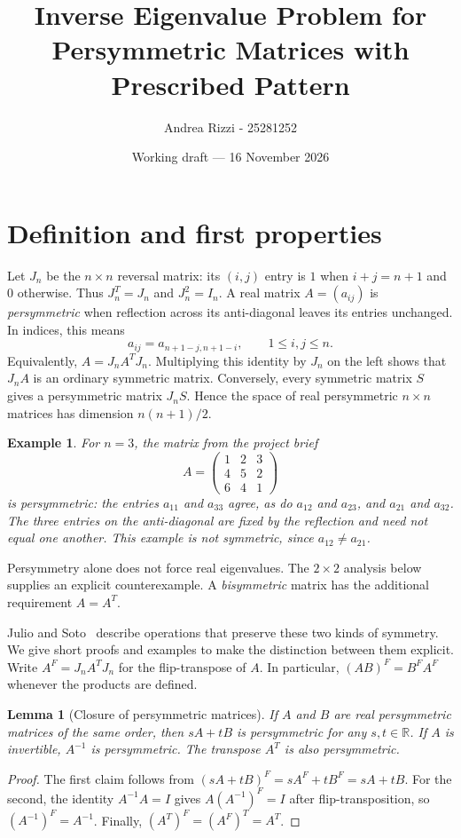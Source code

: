 \documentclass[11pt,a4paper]{article}
\title{Inverse Eigenvalue Problem for Persymmetric Matrices with Prescribed Pattern}
\author{Andrea Rizzi - 25281252}
\date{Working draft --- 16 November 2026}
\newtheorem{example}{Example}
\newtheorem{lemma}{Lemma}
\begin{document}
\maketitle

\section{Definition and first properties}

Let $J_n$ be the $n\times n$ reversal matrix: its $(i,j)$ entry is $1$ when
$i+j=n+1$ and $0$ otherwise. Thus $J_n^T=J_n$ and $J_n^2=I_n$. A real matrix
$A=(a_{ij})$ is \emph{persymmetric} when reflection across its anti-diagonal
leaves its entries unchanged. In indices, this means
\begin{equation}\label{eq:persymmetry}
 a_{ij}=a_{n+1-j,n+1-i},\qquad 1\leq i,j\leq n.
\end{equation}
Equivalently, $A=J_nA^TJ_n$. Multiplying this identity by $J_n$ on the left
shows that $J_nA$ is an ordinary symmetric matrix. Conversely, every symmetric
matrix $S$ gives a persymmetric matrix $J_nS$. Hence the space of real
persymmetric $n\times n$ matrices has dimension $n(n+1)/2$.

\begin{example}
For $n=3$, the matrix from the project brief~\cite{project-brief}
\[
 A=\begin{pmatrix}1&2&3\\4&5&2\\6&4&1\end{pmatrix}
\]
is persymmetric: the entries $a_{11}$ and $a_{33}$ agree, as do $a_{12}$ and
$a_{23}$, and $a_{21}$ and $a_{32}$. The three entries on the anti-diagonal
are fixed by the reflection and need not equal one another. This example is
not symmetric, since $a_{12}\ne a_{21}$.
\end{example}

Persymmetry alone does not force real eigenvalues. The $2\times2$ analysis
below supplies an explicit counterexample. A \emph{bisymmetric} matrix has the
additional requirement $A=A^T$.

Julio and Soto~\cite[Lemmas~1.1 and~1.2]{julio-soto} describe operations
that preserve these two kinds of symmetry. We give short proofs and examples
to make the distinction between them explicit. Write $A^F=J_nA^TJ_n$ for the
flip-transpose of $A$. In particular, $(AB)^F=B^FA^F$ whenever the products
are defined.

\begin{lemma}[Closure of persymmetric matrices]\label{lem:persymmetric-closure}
If $A$ and $B$ are real persymmetric matrices of the same order, then
$sA+tB$ is persymmetric for any $s,t\in\mathbb R$. If $A$ is invertible,
$A^{-1}$ is persymmetric. The transpose $A^T$ is also persymmetric.
\end{lemma}
\begin{proof}
The first claim follows from
$(sA+tB)^F=sA^F+tB^F=sA+tB$. For the second, the identity
$A^{-1}A=I$ gives $A(A^{-1})^F=I$ after flip-transposition, so
$(A^{-1})^F=A^{-1}$. Finally,
$(A^T)^F=(A^F)^T=A^T$.
\end{proof}
\end{document}
